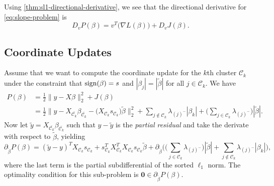 \begin{remark}
  Using \cref{thm:sl1-directional-derivative}, we see that
  the directional derivative for \eqref{eq:slope-problem} is
  \[
    D_v P(\beta) = v^T \big(\nabla L(\beta)\big) + D_v J(\beta).
  \]
\end{remark}

\subsection{Coordinate Updates}%
\label{sec:coordinate-updates}

Assume that we want to compute the coordinate update for the \(k\)th cluster
\(\mathcal{C}_k\) under the constraint that \(\operatorname{sign}(\beta) = s\) and
\(|\beta_j| = |\tilde \beta|\) for all \(j \in \mathcal{C}_k\).
We have
\[
  \begin{aligned}
    P(\beta) & =  \frac{1}{2} \lVert y - X\beta\rVert_2^2 + J(\beta)                                                                                                                                                                                                                                   \\
             & = \frac{1}{2} \lVert y - X_{\bar{\mathcal{C}_k}} \beta_{\bar{\mathcal{C}_k}} - \big(X_{\mathcal{C}_k} s_{\mathcal{C}_k}\big)\tilde\beta  \rVert_2^2 + \sum_{j \notin {\mathcal{C}_k}} \lambda_{(j)^-}|\beta_k| + \bigg(\sum_{j \in {\mathcal{C}_k}} \lambda_{(j)^-}\bigg)|\tilde\beta|.
  \end{aligned}
\]
Now let \(\tilde y = X_{\bar{\mathcal{C}_k}} \beta_{\bar{\mathcal{C}_k}}\)
such that \(y - \tilde y\) is the \emph{partial residual} and take the
derivate with respect to \(\tilde\beta\), yielding
\begin{equation}
  \label{eq:cluster-grad}
  \partial_{\tilde\beta}
  P(\beta) = (\tilde y - y)^T X_{\mathcal{C}_k} s_{\mathcal{C}_k} + s_{\mathcal{C}_k}^T X_{{\mathcal{C}_k}}^T X_{\mathcal{C}_k} s_{\mathcal{C}_k} \tilde\beta + \partial_{\tilde\beta}\Bigg(\bigg(\sum_{j \in {\mathcal{C}_k}} \lambda_{(j)^-}\bigg)|\tilde\beta| + \sum_{j \notin \mathcal{C}_k}\lambda_{(j)^-}|\beta_k|\Bigg),
\end{equation}
where the last term is the partial subdifferential of the sorted \(\ell_1\)
norm.
The optimality condition for this sub-problem is \(\boldsymbol{0} \in
\partial_{\tilde \beta} P(\beta).
\)

